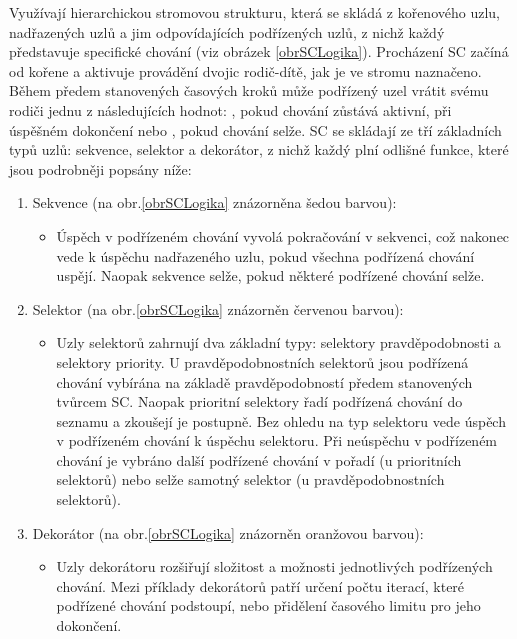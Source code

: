 Využívají hierarchickou stromovou strukturu, která se skládá z kořenového uzlu, nadřazených uzlů a jim odpovídajících podřízených uzlů, z nichž každý představuje specifické chování (viz obrázek \ref{obrSCLogika}). Procházení SC začíná od kořene a aktivuje provádění dvojic rodič-dítě, jak je ve stromu naznačeno. Během předem stanovených časových kroků může podřízený uzel vrátit svému rodiči jednu z následujících hodnot: , pokud chování zůstává aktivní,  při úspěšném dokončení nebo , pokud chování selže. SC se skládají ze tří základních typů uzlů: sekvence, selektor a dekorátor, z nichž každý plní odlišné funkce, které jsou podrobněji popsány níže:
\begin{enumerate}
	\item Sekvence (na obr.\ref{obrSCLogika} znázorněna šedou barvou):
	\begin{itemize}
		\item Úspěch v podřízeném chování vyvolá pokračování v sekvenci, což nakonec vede k úspěchu nadřazeného uzlu, pokud všechna podřízená chování uspějí. Naopak sekvence selže, pokud některé podřízené chování selže. 
	\end{itemize} 
	\item Selektor (na obr.\ref{obrSCLogika} znázorněn červenou barvou):
	\begin{itemize}
		\item Uzly selektorů zahrnují dva základní typy: selektory pravděpodobnosti a selektory priority. U pravděpodobnostních selektorů jsou podřízená chování vybírána na základě pravděpodobností předem stanovených tvůrcem SC. Naopak prioritní selektory řadí podřízená chování do seznamu a zkoušejí je postupně. Bez ohledu na typ selektoru vede úspěch v podřízeném chování k úspěchu selektoru. Při neúspěchu v podřízeném chování je vybráno další podřízené chování v pořadí (u prioritních selektorů) nebo selže samotný selektor (u pravděpodobnostních selektorů).
	\end{itemize} 
	\item Dekorátor (na obr.\ref{obrSCLogika} znázorněn oranžovou barvou):
	\begin{itemize}
		\item Uzly dekorátoru rozšiřují složitost a možnosti jednotlivých podřízených chování. Mezi příklady dekorátorů patří určení počtu iterací, které podřízené chování podstoupí, nebo přidělení časového limitu pro jeho dokončení.
	\end{itemize} 
\end{enumerate}

